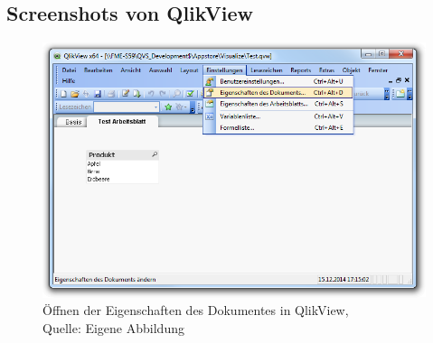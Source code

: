 \begin{appendix} 

\renewcommand\section{\stdsection}

\newpage

\section*{Anhang} 
\renewcommand{\thesubsection}{\Alph{subsection}}

\subsection{Screenshots von QlikView} 
\label{lab:ScreenshotsVonQlikView}

\begin{figure}[htbp]
	\centering
		\includegraphics[width=1.00\textwidth]{img/DocumentExtensionListe/EigenschaftendesDokumentes.png}
	\caption[Öffnen der Eigenschaften des Dokumentes in QlikView]{Öffnen der Eigenschaften des Dokumentes in QlikView, \\Quelle: Eigene Abbildung}
	\label{fig:EigenschaftendesDokumentes}
\end{figure}



\end{appendix}
